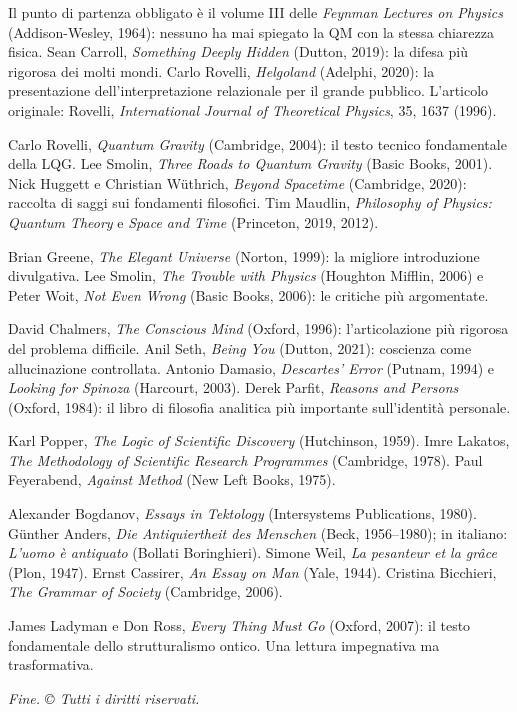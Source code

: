 \documentclass[12pt,a4paper,openany]{book}
\newcommand{\sezione}[1]{\vspace{1.2em}{\large\bfseries #1}\vspace{0.5em}\par}
\begin{document}
\sezione{Meccanica quantistica e interpretazioni}

Il punto di partenza obbligato è il volume III delle \textit{Feynman Lectures on Physics} (Addison-Wesley, 1964): nessuno ha mai spiegato la QM con la stessa chiarezza fisica. Sean Carroll, \textit{Something Deeply Hidden} (Dutton, 2019): la difesa più rigorosa dei molti mondi. Carlo Rovelli, \textit{Helgoland} (Adelphi, 2020): la presentazione dell'interpretazione relazionale per il grande pubblico. L'articolo originale: Rovelli, \textit{International Journal of Theoretical Physics}, 35, 1637 (1996).

\sezione{Gravità quantistica}

Carlo Rovelli, \textit{Quantum Gravity} (Cambridge, 2004): il testo tecnico fondamentale della LQG. Lee Smolin, \textit{Three Roads to Quantum Gravity} (Basic Books, 2001). Nick Huggett e Christian Wüthrich, \textit{Beyond Spacetime} (Cambridge, 2020): raccolta di saggi sui fondamenti filosofici. Tim Maudlin, \textit{Philosophy of Physics: Quantum Theory} e \textit{Space and Time} (Princeton, 2019, 2012).

\sezione{Teoria delle stringhe}

Brian Greene, \textit{The Elegant Universe} (Norton, 1999): la migliore introduzione divulgativa. Lee Smolin, \textit{The Trouble with Physics} (Houghton Mifflin, 2006) e Peter Woit, \textit{Not Even Wrong} (Basic Books, 2006): le critiche più argomentate.

\sezione{Coscienza, neuroscienze, e mente}

David Chalmers, \textit{The Conscious Mind} (Oxford, 1996): l'articolazione più rigorosa del problema difficile. Anil Seth, \textit{Being You} (Dutton, 2021): coscienza come allucinazione controllata. Antonio Damasio, \textit{Descartes' Error} (Putnam, 1994) e \textit{Looking for Spinoza} (Harcourt, 2003). Derek Parfit, \textit{Reasons and Persons} (Oxford, 1984): il libro di filosofia analitica più importante sull'identità personale.

\sezione{Filosofia della scienza ed epistemologia}

Karl Popper, \textit{The Logic of Scientific Discovery} (Hutchinson, 1959). Imre Lakatos, \textit{The Methodology of Scientific Research Programmes} (Cambridge, 1978). Paul Feyerabend, \textit{Against Method} (New Left Books, 1975).

\sezione{Voci meno conosciute}

Alexander Bogdanov, \textit{Essays in Tektology} (Intersystems Publications, 1980). Günther Anders, \textit{Die Antiquiertheit des Menschen} (Beck, 1956--1980); in italiano: \textit{L'uomo è antiquato} (Bollati Boringhieri). Simone Weil, \textit{La pesanteur et la grâce} (Plon, 1947). Ernst Cassirer, \textit{An Essay on Man} (Yale, 1944). Cristina Bicchieri, \textit{The Grammar of Society} (Cambridge, 2006).

James Ladyman e Don Ross, \textit{Every Thing Must Go} (Oxford, 2007): il testo fondamentale dello strutturalismo ontico. Una lettura impegnativa ma trasformativa.

\vfill

\begin{center}
\small\itshape
Fine. © Tutti i diritti riservati.
\end{center}
\end{document}
